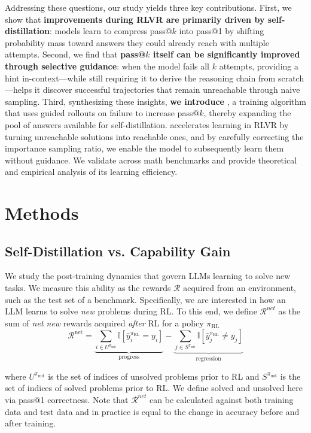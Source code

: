 \documentclass{article}
\begin{document}
Addressing these questions, our study yields three key contributions. First, we show that {\bf improvements during RLVR are primarily driven by self-distillation}: models learn to compress pass@$k$ into pass@1 by shifting probability mass toward answers they could already reach with multiple attempts. Second, we find that {\bf pass@$k$ itself can be significantly improved through selective guidance}: when the model fails all $k$ attempts, providing a hint in-context—while still requiring it to derive the reasoning chain from scratch—helps it discover successful trajectories that remain unreachable through naive sampling. Third, synthesizing these insights, {\bf we introduce }, a training algorithm that uses guided rollouts on failure to increase pass@$k$, thereby expanding the pool of answers available for self-distillation.  accelerates learning in RLVR by turning unreachable solutions into reachable ones, and by carefully correcting the importance sampling ratio, we enable the model to subsequently learn them without guidance. We validate  across math benchmarks
and provide theoretical and empirical analysis of its learning efficiency.

\section{Methods}
\subsection{Self-Distillation vs. Capability Gain} 
We study the post-training dynamics that govern LLMs learning to solve new tasks. We measure this ability as the rewards $\mathcal{R}$ acquired from an environment, such as the test set of a benchmark. Specifically, we are interested in how an LLM learns to solve \textit{new} problems during RL. To this end, we define $\mathcal{R}^{net}$ as the sum of \textit{net new} rewards acquired \textit{after} RL for a policy $\pi_{\text{RL}}$
\begin{equation}
    \mathcal{R}^{\text{net}} = 
    \underbrace{\sum_{i \in U^{\pi_{\text{init}}}} \mathbb{I}[\hat{y}_i^{\pi_{\text{RL}}} = y_i]}_{\text{progress}} 
    - 
    \underbrace{\sum_{j \in S^{\pi_{\text{init}}}} \mathbb{I}[\hat{y}_j^{\pi_{\text{RL}}} \neq y_j]}_{\text{regression}}
\end{equation}

where $U^{\pi_{\text{init}}}$ is the set of indices of unsolved problems prior to RL and $S^{\pi_{\text{init}}}$ is the set of indices of solved problems prior to RL. We define solved and unsolved here via pass@1 correctness. Note that $\mathcal{R}^{net}$ can be calculated against both training data and test data and in practice is equal to the change in accuracy before and after training.
\end{document}
